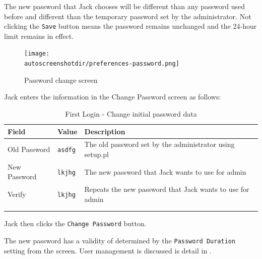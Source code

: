 The new password that Jack chooses will be different than any password used before and 
different than the temporary password set by the administrator.
Not clicking the \texttt{Save} button means the password remains unchanged and the
24-hour limit remains in effect.

\begin{figure}[H]
\centering
\texttt{[image: \\autoscreenshotdir/preferences-password.png]}
\caption{Password change screen}
\label{fig:first-user-password}
\end{figure}

Jack enters the information in the Change Password screen as follows:
\begin{longtable}{ llp{6cm} }
        Field & Value & Description \\ \hline
        \endhead
        Old Password & \texttt{asdfg} & The old password set by the administrator using setup.pl\\
        New Password & \texttt{lkjhg} & The new password that Jack wants to use for admin\\
        Verify & \texttt{lkjhg} &  Repeats the new password that Jack wants to use for admin\\
        \\
        \caption{First Login - Change initial password data}
        \label{fig:first-user-change-initial-password}
\end{longtable}


Jack then clicks the \texttt{Change Password} button.

The new password has a validity of determined by the \texttt{Password Duration} setting
from the  screen. User management is discussed is detail in .

